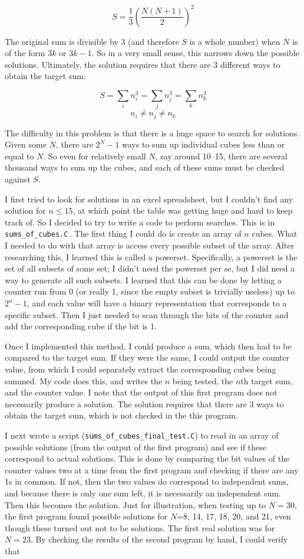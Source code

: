 \documentclass{article}
\begin{document}
\[
S=\frac{1}{3}\left(\frac{N(N+1)}{2}\right)^{2}
\]

The original sum is divisible by 3 (and therefore $S$ is a whole number) when $N$ is of the form $3k$ or $3k-1$.
So in a very small sense, this narrows down the possible solutions.
Ultimately, the solution requires that there are 3 different ways to obtain the target sum:

\[
S=\sum_{i} n_{i}^{3}=\sum_{j} n_{j}^{3}=\sum_{k} n_{k}^{3}
\]
\[
n_{i}\neq n_{j}\neq n_{k}
\]

The difficulty in this problem is that there is a huge space to search for solutions.
Given some $N$, there are $2^{N}-1$ ways to sum up individual cubes less than or equal to $N$.
So even for relatively small $N$, say around 10--15, there are several thousand ways to sum up the cubes, and each of these sums must be checked against $S$.

I first tried to look for solutions in an excel spreadsheet, but I couldn't find any solution for $n\leq 15$, at which point the table was getting huge and hard to keep track of.
So I decided to try to write a code to perform searches.
This is in \texttt{sums\_of\_cubes.C}\,.
The first thing I could do is create an array of $n$ cubes.
What I needed to do with that array is access every possible subset of the array.
After researching this, I learned this is called a powerset.
Specifically, a powerset is the set of all subsets of some set; I didn't need the powerset per se, but I did need a way to generate all such subsets.
I learned that this can be done by letting a counter run from 0 (or really 1, since the empty subset is trivially useless) up to $2^{n}-1$, and each value will have a binary representation that corresponds to a specific subset.
Then I just needed to scan through the bits of the counter and add the corresponding cube if the bit is 1.

Once I implemented this method, I could produce a sum, which then had to be compared to the target sum.
If they were the same, I could output the counter value, from which I could separately extract the corresponding cubes being summed.
My code does this, and writes the $n$ being tested, the $n$th target sum, and the counter value.
I note that the output of this first program does not necessarily produce a solution.
The solution requires that there are 3 ways to obtain the target sum, which is not checked in the this program.

I next wrote a script (\texttt{sums\_of\_cubes\_final\_test.C}) to read in an array of possible solutions (from the output of the first program) and see if these correspond to actual solutions.
This is done by comparing the bit values of the counter values two at a time from the first program and checking if there are any 1s in common.
If not, then the two values do correspond to independent sums, and because there is only one sum left, it is necessarily an independent sum.
Then this becomes the solution.
Just for illustration, when testing up to $N=30$, the first program found possible solutions for $N$=8, 14, 17, 18, 20, and 21, even though these turned out not to be solutions.
The first real solution was for $N=23$.
By checking the results of the second program by hand, I could verify that
\end{document}
